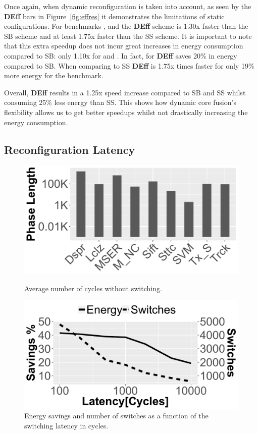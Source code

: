 Once again, when dynamic reconfiguration is taken into account, as seen by the \textbf{DEff} bars in Figure~\ref{fig:effres} it demonstrates the limitations of static configurations.
For benchmarks ,  and  the \textbf{DEff} scheme is 1.30x faster than the SB scheme and at least 1.75x faster than the SS scheme.
It is important to note that this extra speedup does not incur great increases in energy consumption compared to SB: only 1.10x for  and .
In fact, for  \textbf{DEff} saves 20\% in energy compared to SB.
When comparing to SS \textbf{DEff} is 1.75x times faster for only 19\% more energy for the  benchmark.

Overall, \textbf{DEff} results in a 1.25x speed increase compared to SB and SS whilst consuming 25\% less energy than SS.
This shows how dynamic core fusion's flexibility allows us to get better speedups whilst not drastically increasing the energy consumption.

\subsection{Reconfiguration Latency} \label{sec:reconfoverhead}

\begin{figure}[t]
	\begin{minipage}{.5\textwidth}
	\includegraphics[width=.9\linewidth]{cases-paper/graphics/Exploration/condensed_clust.pdf}
    \caption{Average number of cycles without switching.}
    \label{fig:avlen}
	\end{minipage}%
	\begin{minipage}{.5\textwidth}
	\hfill
	\includegraphics[width=.9\linewidth]{cases-paper/graphics/Exploration/latency_2.pdf}
    \caption{Energy savings and number of switches as a function of the switching latency in cycles.}
    \label{fig:enlatency}
\end{minipage}
\vspace{5mm}
\end{figure}

